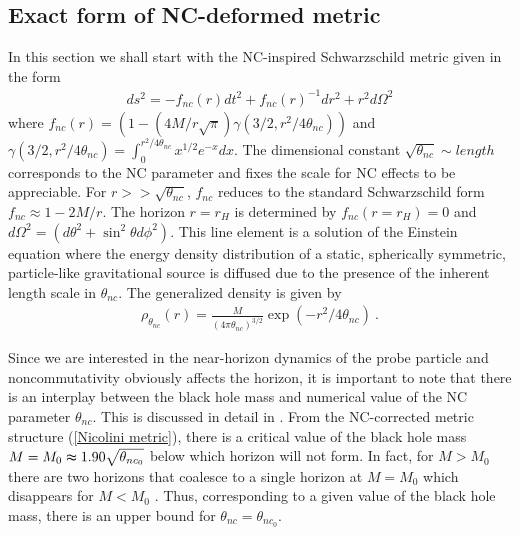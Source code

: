 \documentclass[aps,prd,showpacs,nofootinbib,floats,floatfix,preprintnumbers,groupedaddress,twocolumn]{revtex4-1}
\begin{document}
\subsection{Exact form of NC-deformed metric}
\par\noindent
In this section we shall start with the NC-inspired Schwarzschild metric given in the form \cite{Nicolini:2008aj} 
%
%
%
\begin{eqnarray}
ds^2 = -f_{nc}(r)dt^2 + f_{nc}(r)^{-1} dr^2 + r^2 d\Omega^2\label{Nicolini metric}
\end{eqnarray}
where $f_{nc}(r)=\left(1-(4 M/r \sqrt{\pi})\gamma(3/2,r^2/4 \theta_{nc})\right)$ and 
$\gamma(3/2, r^2/4\theta_{nc}) = \int_{0}^{r^2/4\theta_{nc}}x^{1/2} e^{-x} dx $. The dimensional constant ${\sqrt{\theta_{nc}}}\sim length $ corresponds to the NC parameter and fixes the scale for NC effects to be appreciable. For $r>>{\sqrt{\theta_{nc}}}$, $f_{nc}$ reduces to the standard Schwarzschild form $f_{nc}\approx 1-2M/r$. The horizon $r=r_{H}$ is determined by $f_{nc}(r=r_{H})=0$ and $d\Omega^{2}=(d\theta^{2}+\sin^{2}\theta d\phi^{2})$. This line element is a solution of the Einstein equation where the energy density distribution of a static, spherically symmetric,  particle-like gravitational source is  diffused due to the presence of the inherent length scale in $\theta_{nc}$.  The generalized density is given by \cite{Nicolini:2008aj}
\begin{eqnarray}
\rho_{\theta_{nc}}(r)=\frac{M}{(4\pi\theta_{nc})^{3/2}}\exp\left(-r^{2}/4\theta_{nc}\right)~.\label{energy density}
\end{eqnarray}	
%
%
%
\par\noindent
Since we are interested in the near-horizon dynamics of the probe particle and noncommutativity obviously affects the horizon, it is important  to  note that there is an interplay between the black hole mass and numerical value of the NC parameter $\theta_{nc}$. This is discussed in detail in \cite{Nicolini:2008aj}. From the NC-corrected metric structure (\ref{Nicolini metric}), there is a critical value of the black hole mass $M=M_{0}\thickapprox1.90\sqrt{\theta_{{nc}_0}}$ below which horizon will not form. In fact, for $M>M_{0}$ there are two horizons that coalesce to a single horizon at $M=M_{0}$ which disappears for $M<M_{0}$ \cite{Nicolini:2008aj}. Thus, corresponding to a given value of the black hole mass, there is an upper bound for $\theta_{nc}=\theta_{{nc}_0}$.
\end{document}
